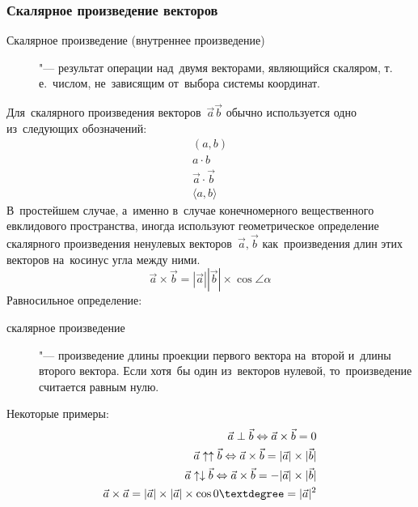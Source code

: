 \documentclass[]{scrartcl}
\begin{document}
\subsubsection{Скалярное произведение векторов}
\begin{description}
	\item[Скалярное произведение (внутреннее произведение)]  "--- результат операции над~двумя векторами, являющийся скаляром, т.\,е.~числом, не~зависящим от~выбора системы координат.
\end{description}
Для~скалярного произведения векторов~${\textstyle \vec{a} \vec{b}}$ обычно используется одно из~следующих обозначений:
\begin{equation*}\label{eq:scalar-product-of-vectors-0}
\begin{aligned}
(a,b)\\
a \cdot b\\
\vec{a} \cdot \vec{b}\\
\langle a,b \rangle
\end{aligned}
\end{equation*}
В~простейшем случае, а~именно в~случае конечномерного вещественного евклидового пространства, иногда используют геометрическое определение скалярного произведения ненулевых векторов~${\textstyle \vec{a},\vec{b}}$ как~произведения длин этих векторов на~косинус угла между ними.
\begin{equation}\label{eq:scalar-product-of-vectors-1}
\vec{a} \times \vec{b} = |\vec{a}||\vec{b}|\times \cos \angle \alpha
\end{equation}
Равносильное определение:
\begin{description}
	\item[скалярное произведение]  "--- произведение длины проекции первого вектора на~второй и~длины второго вектора. Если хотя~бы один из~векторов нулевой, то~произведение считается равным нулю. 
\end{description}
Некоторые примеры:
\begin{equation}\label{eq:scalar-product-of-vectors-2}
\begin{aligned}
\vec{a} \perp \vec{b} \Leftrightarrow \vec{a} \times \vec{b} = 0\\
\vec{a} \uparrow \uparrow \vec{b} \Leftrightarrow \vec{a} \times \vec{b} = |\vec{a}|\times|\vec{b}|\\
\vec{a} \uparrow \downarrow \vec{b} \Leftrightarrow \vec{a} \times \vec{b} = -|\vec{a}|\times|\vec{b}|\\
\vec{a}\times \vec{a} = |\vec{a}|\times|\vec{a}| \times \cos 0\textdegree = |\vec{a}|^2
\end{aligned}
\end{equation}  
\end{document}
